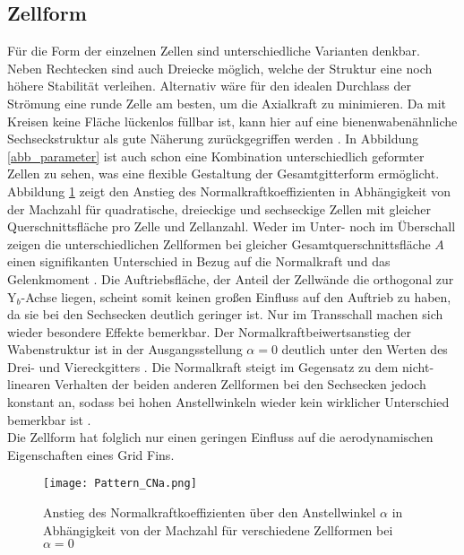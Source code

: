 \subsection{Zellform} \label{sec_zellform}
Für die Form der einzelnen Zellen sind unterschiedliche Varianten denkbar. Neben Rechtecken sind auch Dreiecke möglich, welche der Struktur eine noch höhere Stabilität verleihen. Alternativ wäre für den idealen Durchlass der Strömung eine runde Zelle am besten, um die Axialkraft zu minimieren. Da mit Kreisen keine Fläche lückenlos füllbar ist, kann hier auf eine bienenwabenähnliche Sechseckstruktur als gute Näherung zurückgegriffen werden \cite{Pattern}. In Abbildung \ref{abb_parameter} ist auch schon eine Kombination unterschiedlich geformter Zellen zu sehen, was eine flexible Gestaltung der Gesamtgitterform ermöglicht.\\
Abbildung \ref{abb_Form-Cn} zeigt den Anstieg des Normalkraftkoeffizienten in Abhängigkeit von der Machzahl für quadratische, dreieckige und sechseckige Zellen mit gleicher Querschnittsfläche pro Zelle und Zellanzahl.
Weder im Unter- noch im Überschall zeigen die unterschiedlichen Zellformen bei gleicher Gesamtquerschnittsfläche $A$ einen signifikanten Unterschied in Bezug auf die Normalkraft und das Gelenkmoment \cite{Pattern}. Die Auftriebsfläche, der Anteil der Zellwände die orthogonal zur Y$_b$-Achse liegen, scheint somit keinen großen Einfluss auf den Auftrieb zu haben, da sie bei den Sechsecken deutlich geringer ist. Nur im Transschall machen sich wieder besondere Effekte bemerkbar. Der Normalkraftbeiwertsanstieg der Wabenstruktur ist in der Ausgangsstellung $\alpha = 0$ deutlich unter den Werten des Drei- und Viereckgitters \cite{Pattern}. Die Normalkraft steigt im Gegensatz zu dem nicht-linearen Verhalten der beiden anderen Zellformen bei den Sechsecken jedoch konstant an, sodass bei hohen Anstellwinkeln wieder kein wirklicher Unterschied bemerkbar ist \cite{Pattern}.\\
Die Zellform hat folglich nur einen geringen Einfluss auf die aerodynamischen Eigenschaften eines Grid Fins.
\begin{figure}[h]
	\centering
	\texttt{[image: Pattern\_CNa.png]}
	\begin{flushright}
	\end{flushright}
	\caption{Anstieg des Normalkraftkoeffizienten über den Anstellwinkel $\alpha$ in Abhängigkeit von der Machzahl für verschiedene Zellformen bei $\alpha = 0$}
	\label{abb_Form-Cn}
\end{figure}
